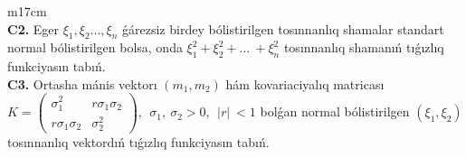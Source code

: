 \documentclass{article}
\begin{document}
\begin{tabular}{m{17cm}}
 \\
\textbf{C2.} Eger \(\xi_{1},\xi_{2}...,\xi_{n}\) ǵárezsiz birdey bólistirilgen tosınnanlıq shamalar standart normal bólistirilgen bolsa, onda \(\xi_{1}^{2} + \xi_{2}^{2} + ...\  + \xi_{n}^{2}\) tosınnanlıq shamanıń tıǵızlıq funkciyasın tabıń.
 \\
\textbf{C3.} Ortasha mánis vektorı \(\left( m_{1},m_{2} \right)\) hám kovariaciyalıq matricası\(K = \begin{pmatrix}
\sigma_{1}^{2} & r\sigma_{1}\sigma_{2} \\
r\sigma_{1}\sigma_{2} & \sigma_{2}^{2}
\end{pmatrix},\ \ \sigma_{1},\ \sigma_{2} > 0,\ \ |r|\  < 1\) bolǵan normal bólistirilgen \(\left( \xi_{1},\xi_{2} \right)\) tosınnanlıq vektordıń tıǵızlıq funkciyasın tabıń.
 \\

\end{tabular}
\vspace{1cm}
\end{document}
